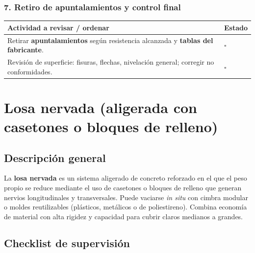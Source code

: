 \documentclass[12pt]{article}
\newcommand{\cbox}{\(\square\)} %
\begin{document}
 \subsubsection*{7. Retiro de apuntalamientos y control final}
 \begin{tabularx}{\linewidth}{>{\raggedright\arraybackslash}p{0.93\linewidth} >{\centering\arraybackslash}m{0.07\linewidth}}
 	\toprule
 	\textbf{Actividad a revisar / ordenar} & \textbf{Estado}\\
 	\midrule
 	Retirar \textbf{apuntalamientos} según resistencia alcanzada y \textbf{tablas del fabricante}. & \cbox \\
 	Revisión de superficie: fisuras, flechas, nivelación general; corregir no conformidades. & \cbox \\
 	\bottomrule
 \end{tabularx}
 
 
 
 
 \section{Losa nervada (aligerada con casetones o bloques de relleno)}
 
 \subsection*{Descripción general}
 La \textbf{losa nervada} es un sistema aligerado de concreto reforzado en el que el peso propio se reduce mediante el uso de casetones o bloques de relleno que generan nervios longitudinales y transversales. Puede vaciarse \emph{in situ} con cimbra modular o moldes reutilizables (plásticos, metálicos o de poliestireno). Combina economía de material con alta rigidez y capacidad para cubrir claros medianos a grandes.
 
 
 
 \subsection{Checklist de supervisión}
 
\end{document}
